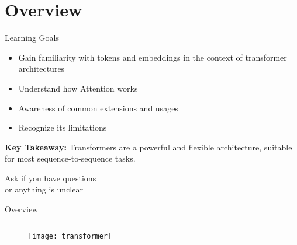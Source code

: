 \section{Overview}

\begin{frame}[c]{Learning Goals}
    \large
    \begin{itemize}[<+(1)->]
        \item Gain familiarity with tokens and embeddings in the context of
            transformer architectures
        \item Understand how Attention works
        \item Awareness of common extensions and usages
        \item Recognize its limitations
    \end{itemize}
    \pause
    \textbf{Key Takeaway:} Transformers are a powerful and flexible
    architecture, suitable for most sequence-to-sequence tasks.
\end{frame}

\addtocounter{framenumber}{1}
\begin{frame}[standout]
    \huge
    Ask if you have questions \\
    or anything is unclear
\end{frame}

\begin{frame}[c]{Overview}
    \begin{figure}
        \begin{columns}
            \texttt{[image: transformer]}
        \end{columns}
    \end{figure}
\end{frame}

